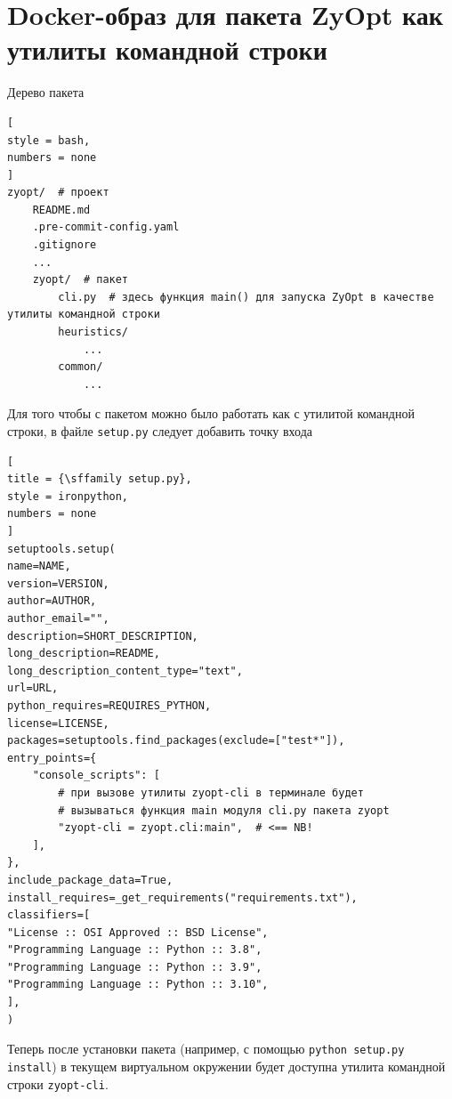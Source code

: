 \documentclass[%
	11pt,
	a4paper,
	utf8,
		]{article}
\begin{document}
\section{Docker-образ для пакета ZyOpt как утилиты командной строки}

Дерево пакета
\begin{lstlisting}[
style = bash,
numbers = none
]
zyopt/  # проект
    README.md
    .pre-commit-config.yaml
    .gitignore
    ...
    zyopt/  # пакет
        cli.py  # здесь функция main() для запуска ZyOpt в качестве утилиты командной строки
        heuristics/
            ...
        common/
            ...
\end{lstlisting}

Для того чтобы с пакетом можно было работать как с утилитой командной строки, в файле \verb*|setup.py| следует добавить точку входа
\begin{lstlisting}[
title = {\sffamily setup.py},
style = ironpython,
numbers = none
]
setuptools.setup(
name=NAME,
version=VERSION,
author=AUTHOR,
author_email="",
description=SHORT_DESCRIPTION,
long_description=README,
long_description_content_type="text",
url=URL,
python_requires=REQUIRES_PYTHON,
license=LICENSE,
packages=setuptools.find_packages(exclude=["test*"]),
entry_points={
	"console_scripts": [
		# при вызове утилиты zyopt-cli в терминале будет
		# вызываться функция main модуля cli.py пакета zyopt
		"zyopt-cli = zyopt.cli:main",  # <== NB!
	],
},
include_package_data=True,
install_requires=_get_requirements("requirements.txt"),
classifiers=[
"License :: OSI Approved :: BSD License",
"Programming Language :: Python :: 3.8",
"Programming Language :: Python :: 3.9",
"Programming Language :: Python :: 3.10",
],
)
\end{lstlisting}

Теперь после установки пакета (например, с помощью \verb|python setup.py install|) в текущем виртуальном окружении будет доступна утилита командной строки \verb*|zyopt-cli|.
\end{document}
